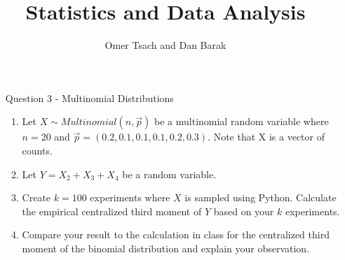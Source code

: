 \documentclass[11pt]{article}
\begin{document}
\title{Statistics and Data Analysis}
\author{Omer Tsach and Dan Barak}
\date{}
\maketitle

\begin{enumerate}
    \item[Question 3]  - Multinomial Distributions
    \begin{enumerate}

        \item Let $X \sim Multinomial(n,\vec{p})$ be a multinomial random variable where $n=20$ and $\vec{p} = (0.2,  0.1,  0.1,  0.1,  0.2,  0.3)$. Note that X is a vector of counts.
    
    
        \item Let $Y = X_2 + X_3 + X_4$ be a random variable.
    
    
        \item Create $k=100$ experiments where $X$ is sampled using Python. Calculate the empirical centralized third moment of $Y$ based on your $k$ experiments.
    
    
        \item Compare your result to the calculation in class for the centralized third moment of the binomial distribution and explain your observation.
    \end{enumerate}

\end{enumerate}
\end{document}
